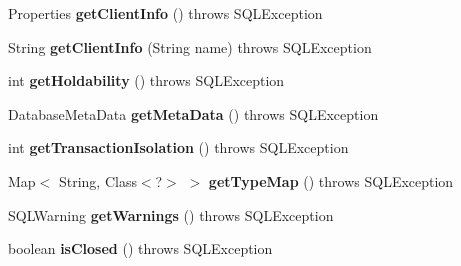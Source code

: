 \begin{DoxyCompactItemize}
\item 
\mbox{\label{classsimpledb_1_1jdbc_1_1ConnectionAdapter_a45adae51d2bf5053a8d579ccb0447ef0}} 
Properties {\bfseries get\+Client\+Info} ()  throws S\+Q\+L\+Exception 
\item 
\mbox{\label{classsimpledb_1_1jdbc_1_1ConnectionAdapter_aa06148cb3a4821ec4b477788bf1277c0}} 
String {\bfseries get\+Client\+Info} (String name)  throws S\+Q\+L\+Exception 
\item 
\mbox{\label{classsimpledb_1_1jdbc_1_1ConnectionAdapter_a34888f8e6cb72186a52579206be02039}} 
int {\bfseries get\+Holdability} ()  throws S\+Q\+L\+Exception 
\item 
\mbox{\label{classsimpledb_1_1jdbc_1_1ConnectionAdapter_a167ac61ceed93903ae90cb93a950aac6}} 
Database\+Meta\+Data {\bfseries get\+Meta\+Data} ()  throws S\+Q\+L\+Exception 
\item 
\mbox{\label{classsimpledb_1_1jdbc_1_1ConnectionAdapter_a7f133eed95c177126eac91773fb997c5}} 
int {\bfseries get\+Transaction\+Isolation} ()  throws S\+Q\+L\+Exception 
\item 
\mbox{\label{classsimpledb_1_1jdbc_1_1ConnectionAdapter_a123ac1d45102702467842a2dc1818994}} 
Map$<$ String, Class$<$?$>$ $>$ {\bfseries get\+Type\+Map} ()  throws S\+Q\+L\+Exception 
\item 
\mbox{\label{classsimpledb_1_1jdbc_1_1ConnectionAdapter_a9c5d1f618654f06d704446838dbf2530}} 
S\+Q\+L\+Warning {\bfseries get\+Warnings} ()  throws S\+Q\+L\+Exception 
\item 
\mbox{\label{classsimpledb_1_1jdbc_1_1ConnectionAdapter_a2323f73e7544ecfe00d446c507bfa5c6}} 
boolean {\bfseries is\+Closed} ()  throws S\+Q\+L\+Exception 
\item 
\mbox{\label{classsimpledb_1_1jdbc_1_1ConnectionAdapter_a2cd5a07583c9d300b4c12cdb9654f79e}} 

\end{DoxyCompactItemize}
